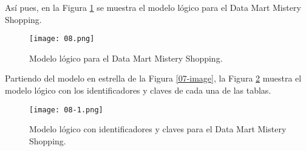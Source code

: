 Así pues, en la Figura \ref{08-image} se muestra el modelo lógico para el Data Mart Mistery Shopping.

\begin{figure}[!th]
\texttt{[image: 08.png]}
\centering
\caption{Modelo lógico para el Data Mart Mistery Shopping.}
\label{08-image}
\end{figure}

Partiendo del modelo en estrella de la Figura \ref{07-image}, la Figura \ref{08-1-image} muestra el modelo lógico con los identificadores y claves de cada una de las tablas.

\begin{figure}[!th]
\texttt{[image: 08-1.png]}
\centering
\caption{Modelo lógico con identificadores y claves para el Data Mart Mistery Shopping.}
\label{08-1-image}
\end{figure}
